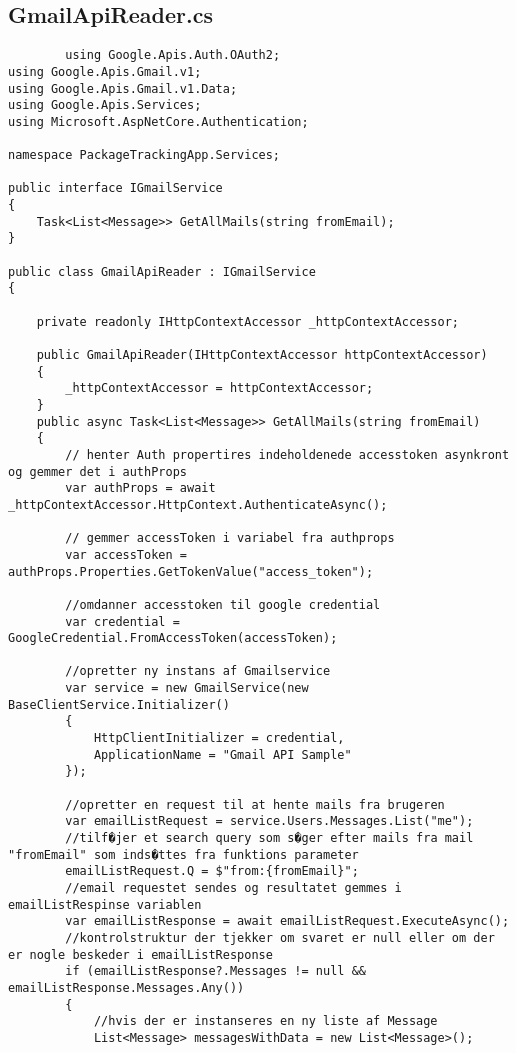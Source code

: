 \subsection{GmailApiReader.cs}
\begin{verbatim}
        using Google.Apis.Auth.OAuth2;
using Google.Apis.Gmail.v1;
using Google.Apis.Gmail.v1.Data;
using Google.Apis.Services;
using Microsoft.AspNetCore.Authentication;

namespace PackageTrackingApp.Services;

public interface IGmailService
{
    Task<List<Message>> GetAllMails(string fromEmail);
}

public class GmailApiReader : IGmailService
{

    private readonly IHttpContextAccessor _httpContextAccessor;

    public GmailApiReader(IHttpContextAccessor httpContextAccessor)
    {
        _httpContextAccessor = httpContextAccessor;
    }
    public async Task<List<Message>> GetAllMails(string fromEmail)
    {
        // henter Auth propertires indeholdenede accesstoken asynkront og gemmer det i authProps
        var authProps = await _httpContextAccessor.HttpContext.AuthenticateAsync();

        // gemmer accessToken i variabel fra authprops
        var accessToken = authProps.Properties.GetTokenValue("access_token");

        //omdanner accesstoken til google credential
        var credential = GoogleCredential.FromAccessToken(accessToken);
        
        //opretter ny instans af Gmailservice
        var service = new GmailService(new BaseClientService.Initializer()
        {
            HttpClientInitializer = credential,
            ApplicationName = "Gmail API Sample"
        });

        //opretter en request til at hente mails fra brugeren
        var emailListRequest = service.Users.Messages.List("me");
        //tilf�jer et search query som s�ger efter mails fra mail "fromEmail" som inds�ttes fra funktions parameter
        emailListRequest.Q = $"from:{fromEmail}";
        //email requestet sendes og resultatet gemmes i emailListRespinse variablen
        var emailListResponse = await emailListRequest.ExecuteAsync();
        //kontrolstruktur der tjekker om svaret er null eller om der er nogle beskeder i emailListResponse
        if (emailListResponse?.Messages != null && emailListResponse.Messages.Any())
        {
            //hvis der er instanseres en ny liste af Message
            List<Message> messagesWithData = new List<Message>();


\end{verbatim}
